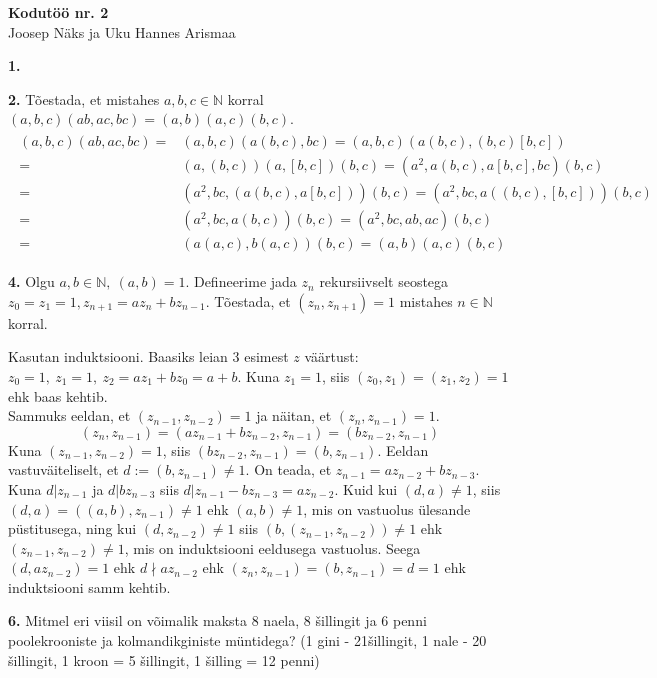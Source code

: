 \documentclass[a4paper, 10pt]{article}
\begin{document}
\begin{center}
\Large\textbf{Kodutöö nr. 2}\\
\small{Joosep Näks ja Uku Hannes Arismaa}
\end{center}
\textbf{1.}

\bigskip

\bigskip
\noindent\textbf{2.} Tõestada, et mistahes $a,b,c\in\mathbb{N}$ korral $(a,b,c)(ab,ac,bc)=(a,b)(a,c)(b,c)$.
\begin{gather*}
\begin{aligned}
(a,b,c)(ab,ac,bc)=&(a,b,c)(a(b,c),bc)=(a,b,c)(a(b,c),(b,c)[b,c])\\
=&(a,(b,c))(a,[b,c])(b,c)=(a^2,a(b,c),a[b,c],bc)(b,c)\\
=&(a^2,bc,(a(b,c),a[b,c]))(b,c)=(a^2,bc,a((b,c),[b,c]))(b,c)\\
=&(a^2,bc,a(b,c))(b,c)=(a^2,bc,ab,ac)(b,c)\\
=&(a(a,c),b(a,c))(b,c)=(a,b)(a,c)(b,c)
\end{aligned}
\end{gather*}
\bigskip

\noindent\textbf{4.} Olgu $a,b\in\mathbb{N},\ (a,b)=1$. Defineerime jada $z_n$ rekursiivselt seostega $z_0=z_1=1, z_{n+1}=az_n+bz_{n-1}$. Tõestada, et $(z_n,z_{n+1})=1$ mistahes $n\in\mathbb{N}$ korral.
\bigskip

Kasutan induktsiooni. Baasiks leian 3 esimest $z$ väärtust: $z_0=1,\ z_1=1,\ z_2=az_1+bz_0=a+b$. Kuna $z_1=1$, siis $(z_0,z_1)=(z_1,z_2)=1$ ehk baas kehtib.\\
Sammuks eeldan, et $(z_{n-1},z_{n-2})=1$ ja näitan, et $(z_n,z_{n-1})=1$. $$(z_n,z_{n-1})=(az_{n-1}+bz_{n-2},z_{n-1})=(bz_{n-2},z_{n-1})$$ Kuna $(z_{n-1},z_{n-2})=1$, siis $(bz_{n-2},z_{n-1})=(b,z_{n-1})$. Eeldan vastuväiteliselt, et $d:=(b,z_{n-1})\neq1$. On teada, et $z_{n-1}=az_{n-2}+bz_{n-3}$. Kuna $d|z_{n-1}$ ja $d|bz_{n-3}$ siis $d|z_{n-1}-bz_{n-3}=az_{n-2}$. Kuid kui $(d,a)\neq1$, siis $(d,a)=((a,b),z_{n-1})\neq1$ ehk $(a,b)\neq1$, mis on vastuolus ülesande püstitusega, ning kui $(d,z_{n-2})\neq1$ siis $(b,(z_{n-1},z_{n-2}))\neq1$ ehk $(z_{n-1},z_{n-2})\neq1$, mis on induktsiooni eeldusega vastuolus. Seega $(d,az_{n-2})=1$ ehk $d\nmid az_{n-2}$ ehk $(z_n,z_{n-1})=(b,z_{n-1})=d=1$ ehk induktsiooni samm kehtib.
\bigskip

\noindent\textbf{6.} Mitmel eri viisil on võimalik maksta 8 naela, 8 šillingit ja 6 penni poolekrooniste ja kolmandikginiste müntidega? (1 gini - 21šillingit, 1 nale - 20 šillingit, 1 kroon = 5 šillingit, 1 šilling = 12 penni)
\end{document}
